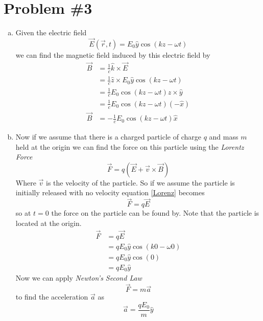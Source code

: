 \documentclass[11pt]{article}
\numberwithin{equation}{section}
\newcommand{\vecE}{\vec{E}}
\begin{document}
\section{Problem \#3}
\begin{enumerate}[(a)]
\item
Given the electric field
$$\vecE(\vec{r},t) = E_0\hat{y}\cos(kz-\omega t)$$
we can find the magnetic field induced by this electric field by
\begin{align*}
\vec{B} &= \frac{1}{c}\hat{k}\times\vecE\\
&= \frac{1}{c}\hat{z}\times E_0\hat{y}\cos(kz-\omega t)\\
&= \frac{1}{c}E_0\cos(kz-\omega t)\hat{z}\times\hat{y}\\
&= \frac{1}{c}E_0\cos(kz-\omega t)(-\hat{x})\\
\vec{B} &= -\frac{1}{c}E_0\cos(kz-\omega t)\hat{x}
\end{align*}

\item
Now if we assume that there is a charged particle of charge $q$ and mass $m$ held at the origin we can find the force on this particle using the \emph{Lorentz Force}
\begin{equation}
\vec{F} = q(\vecE+\vec{v}\times\vec{B})
\label{Lorenz}
\end{equation}
Where $\vec{v}$ is the velocity of the particle. So if we assume the particle is initially released with no velocity equation \ref{Lorenz} becomes
$$\vec{F} = q\vecE$$
so at $t=0$ the force on the particle can be found by. Note that the particle is located at the origin. 
\begin{align*}
\vec{F} &= q\vecE\\
&= qE_0\hat{y}\cos(k0-\omega 0)\\
&= qE_0\hat{y}\cos(0)\\
&= qE_0\hat{y}
\end{align*}
Now we can apply \emph{Newton's Second Law}
\begin{equation}
\vec{F} = m\vec{a}
\label{Newt}
\end{equation}
to find the acceleration $\vec{a}$ as
$$\vec{a} = \frac{qE_0}{m}\hat{y}$$


\end{enumerate}
\end{document}
